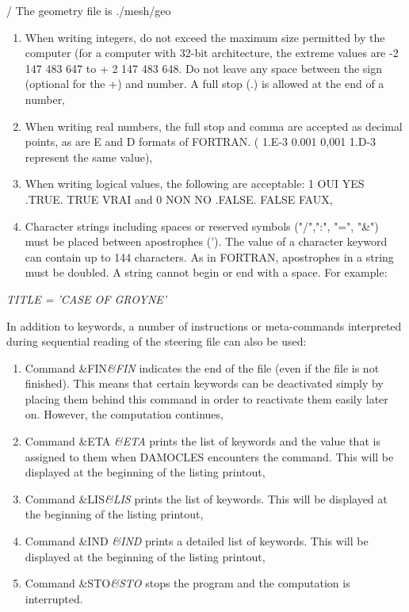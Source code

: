  / The geometry file is ./mesh/geo

\begin{enumerate}
\item  When writing integers, do not exceed the maximum size permitted by the computer (for a computer with 32-bit architecture, the extreme values are -2 147 483 647 to + 2 147 483 648. Do not leave any space between the sign (optional for the +) and number. A full stop (.) is allowed at the end of a number,

\item  When writing real numbers, the full stop and comma are accepted as decimal points, as are E and D formats of FORTRAN. ( 1.E-3  0.001  0,001  1.D-3 represent the same value),

\item  When writing logical values, the following are acceptable: 1 OUI  YES  .TRUE.  TRUE  VRAI and 0 NON  NO  .FALSE.  FALSE  FAUX,

\item  Character strings including spaces or reserved symbols ("/",":", "=", "\&") must be placed between apostrophes ('). The value of a character keyword can contain up to 144 characters. As in FORTRAN, apostrophes in a string must be doubled. A string cannot begin or end with a space. For example:
\end{enumerate}

 \textit{TITLE = 'CASE OF GROYNE'}

 \textit{}

 \textit{}

 In addition to keywords, a number of instructions or meta-commands interpreted during sequential reading of the steering file can also be used:

\begin{enumerate}
\item  Command \&FIN\textit{\&FIN} indicates the end of the file (even if the file is not finished). This means that certain keywords can be deactivated simply by placing them behind this command in order to reactivate them easily later on. However, the computation continues,

\item  Command \&ETA \textit{\&ETA} prints the list of keywords and the value that is assigned to them when DAMOCLES encounters the command. This will be displayed at the beginning of the listing printout,

\item  Command  \&LIS\textit{\&LIS} prints the list of keywords. This will be displayed at the beginning of the listing printout,

\item  Command  \&IND  \textit{\&IND} prints a detailed list of keywords. This will be displayed at the beginning of the listing printout,

\item  Command \&STO\textit{\&STO} stops the program and the computation is interrupted.
\end{enumerate}


